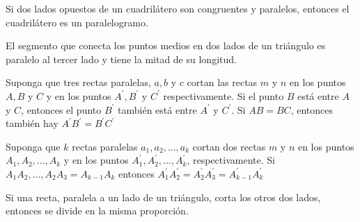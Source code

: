 	    \begin{proposicion}
		Si dos lados opuestos de un cuadrilátero son congruentes y paralelos, entonces el cuadrilátero es un paralelogramo.\\
	    \end{proposicion}

    \begin{teo}
	El segmento que conecta los puntos medios en dos lados de un triángulo es paralelo al tercer lado y tiene la mitad de su longitud.\\
    \end{teo}

	\begin{proposicion}
	    Suponga que tres rectas paralelas, $a,b$ y $c$ cortan las rectas $m$ y $n$ en los puntos $A,B$ y $C$ y en los puntos $A^{'}, B^{'}$ y $C^{'}$ respectivamente. Si el punto $B$ está entre $A$ y $C$, entonces el punto $B^{'}$ también está entre $A^{'}$ y $C^{'}$. Si $AB=BC$, entonces también hay $A^{'} B^{'} = B^{'} C^{'}$\\ 
	\end{proposicion}

    \begin{cor}
	Suponga que $k$ rectas paralelas $a_1,a_2,...,a_k$ cortan dos rectas $m$ y $n$ en los puntos $A_1, A_2,...,A_k$ y en los puntos $A_1^{'},A_2^{'},..., A_k^{'}$, respectivamente. Si $A_1A_2,...,A_2 A_3 = A_{k-1} A_k$ entonces $A_1^{'}A_2^{'}=A_2^{'}A_3^{'}=A_{k-1}^{'}A_k^{'}$
    \end{cor}

    \begin{teo}
	Si una recta, paralela a un lado de un triángulo, corta los otros dos lados, entonces se divide en la misma proporción.\\
    \end{teo}
